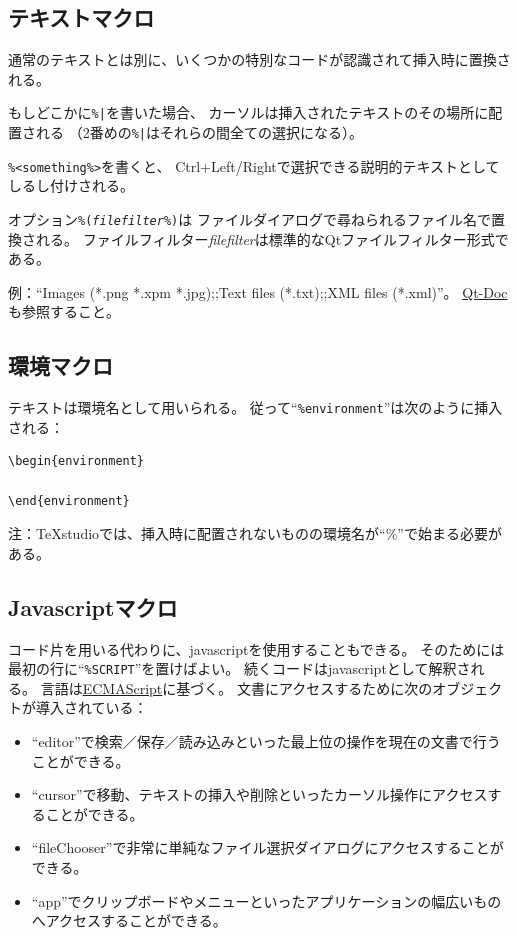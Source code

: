 \subsection{テキストマクロ}

通常のテキストとは別に、いくつかの特別なコードが認識されて挿入時に置換される。

もしどこかに\verb+%|+を書いた場合、
カーソルは挿入されたテキストのその場所に配置される
（2番めの\verb+%|+はそれらの間全ての選択になる）。

\verb+%<something%>+を書くと、
Ctrl+Left/Rightで選択できる説明的テキストとしてしるし付けされる。

オプション\texttt{\%(\emph{filefilter}\%)}は
ファイルダイアログで尋ねられるファイル名で置換される。
ファイルフィルター\emph{filefilter}は標準的なQtファイルフィルター形式である。

例：``Images (*.png *.xpm *.jpg);;Text files (*.txt);;XML files (*.xml)''。
\href{http://qt-project.org/doc/qt-4.8/qfiledialog.html\#getOpenFileName}{Qt-Doc}も参照すること。

\subsection{環境マクロ}

テキストは環境名として用いられる。
従って``\verb+%environment+''は次のように挿入される：

\begin{lstlisting}[frame=single]
\begin{environment}

\end{environment}
\end{lstlisting}

注：TeXstudioでは、挿入時に配置されないものの環境名が``\%''で始まる必要がある。

\subsection{Javascriptマクロ}

コード片を用いる代わりに、javascriptを使用することもできる。
そのためには最初の行に``\verb+%SCRIPT+''を置けばよい。
続くコードはjavascriptとして解釈される。
言語は\href{http://www.ecmascript.org/index.php}{ECMAScript}に基づく。
文書にアクセスするために次のオブジェクトが導入されている：

\begin{itemize}
\item
  ``editor''で検索／保存／読み込みといった最上位の操作を現在の文書で行うことができる。
\item
  ``cursor''で移動、テキストの挿入や削除といったカーソル操作にアクセスすることができる。
\item
  ``fileChooser''で非常に単純なファイル選択ダイアログにアクセスすることができる。
\item
  ``app''でクリップボードやメニューといったアプリケーションの幅広いものへアクセスすることができる。
\end{itemize}

